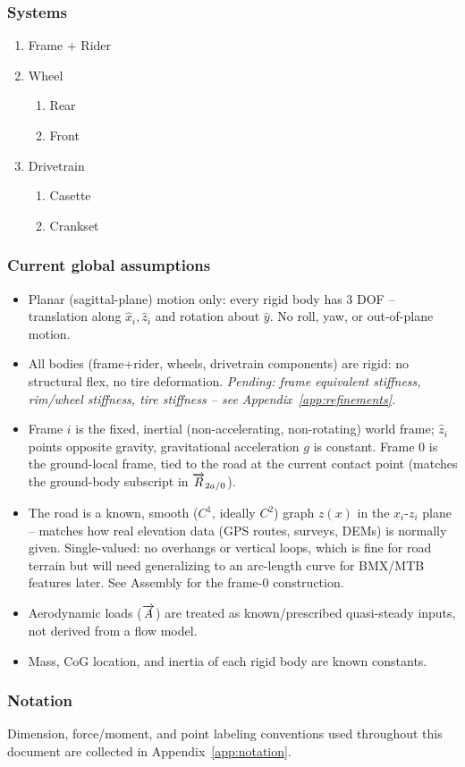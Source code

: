 \subsubsection{Systems}
\begin{enumerate}
    \item Frame + Rider
    \item Wheel
        \begin{enumerate}
            \item Rear
            \item Front
        \end{enumerate}
    \item Drivetrain
        \begin{enumerate}
            \item Casette
            \item Crankset
        \end{enumerate}
\end{enumerate}

\subsubsection{Current global assumptions}
\begin{itemize}
    \item Planar (sagittal-plane) motion only: every rigid body has 3 DOF -- translation along $\hat x_i,\hat z_i$ and rotation about $\hat y$. No roll, yaw, or out-of-plane motion.
    \item All bodies (frame+rider, wheels, drivetrain components) are rigid: no structural flex, no tire deformation. \emph{Pending: frame equivalent stiffness, rim/wheel stiffness, tire stiffness -- see Appendix~\ref{app:refinements}.}
    \item Frame $i$ is the fixed, inertial (non-accelerating, non-rotating) world frame; $\hat z_i$ points opposite gravity, gravitational acceleration $g$ is constant. Frame $0$ is the ground-local frame, tied to the road at the current contact point (matches the ground-body subscript in $\overrightarrow{R}_{2a/0}$).
    \item The road is a known, smooth ($C^1$, ideally $C^2$) graph $z(x)$ in the $x_i$-$z_i$ plane -- matches how real elevation data (GPS routes, surveys, DEMs) is normally given. Single-valued: no overhangs or vertical loops, which is fine for road terrain but will need generalizing to an arc-length curve for BMX/MTB features later. See Assembly for the frame-$0$ construction.
    \item Aerodynamic loads ($\overrightarrow{A}$) are treated as known/prescribed quasi-steady inputs, not derived from a flow model.
    \item Mass, CoG location, and inertia of each rigid body are known constants.
\end{itemize}

\subsubsection{Notation}
Dimension, force/moment, and point labeling conventions used throughout this document are collected in Appendix~\ref{app:notation}.
